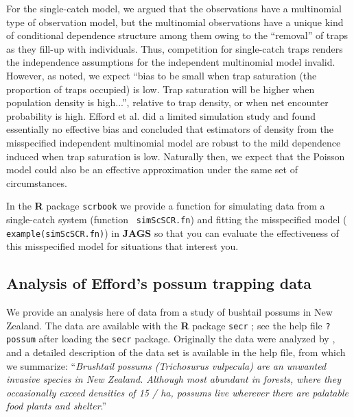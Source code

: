 For the single-catch model, we argued that the observations  
have a multinomial type of observation model, but the
multinomial observations have a unique kind of conditional dependence
structure among them owing to the ``removal'' of traps as they fill-up
with individuals. 
Thus, 
competition for single-catch traps renders the independence
assumptions for the independent multinomial model invalid.  However, as
\citet{efford_etal:2009euring} noted, we expect ``bias to be small
when trap saturation (the proportion of traps occupied) is low.  Trap
saturation will be higher when population density is high...'',
relative to trap density, or when net encounter probability is high.
Efford et al. did a limited simulation study and found essentially no
effective bias and concluded that estimators of density from the
misspecified independent multinomial model are robust to the mild
dependence induced when trap saturation is low.  Naturally then, we
expect that the
Poisson model could also be an effective approximation under the same set
of circumstances.

In the {\bf R} package \mbox{\tt scrbook} we provide a function for
simulating data from a single-catch system (function \mbox{\tt
  simScSCR.fn}) and fitting the misspecified model (\mbox{\tt
  example(simScSCR.fn)}) in {\bf JAGS} so that you can 
evaluate the effectiveness of this misspecified model for 
situations that interest you.


\subsection{Analysis of Efford's possum trapping data}

We provide an analysis here of data from a study of bushtail possums
in New Zealand. The data are available with the {\bf R} package \mbox{\tt secr}
\citep{efford_etal:2009euring};
see the help file \mbox{\tt ?possum} after loading the \mbox{\tt secr} package.
Originally the data were analyzed by \citet{efford_etal:2005}, and
a detailed description of the data set is available in the help file,
from which we summarize:
``{\it Brushtail possums (Trichosurus vulpecula) are an unwanted invasive
species in New Zealand. Although most abundant in forests, where they
occasionally exceed densities of 15 / ha, possums live wherever there
are palatable food plants and shelter}.''

